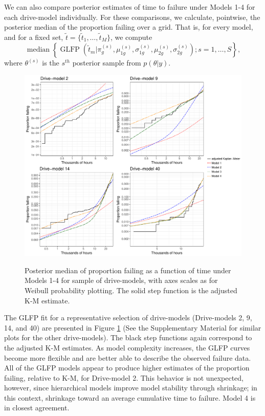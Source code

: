 \documentclass[aap]{imsart}
\newcommand{\op}{\operatorname}
\begin{document}
We can also compare posterior estimates of time to failure under Models 1-4 for each drive-model individually.  For these comparisons, we calculate, pointwise, the posterior median of the proportion failing over a grid. That is, for every model, and for a fixed set, $\tilde{t}=\{\tilde{t}_1,\ldots,\tilde{t}_M\}$, we compute 
\begin{equation}
\label{pointwise-medians}
\op{median}\left\{\op{GLFP}\left(\tilde{t}_m|\pi_{g}^{(s)},\mu_{1g}^{(s)},\sigma_{1g}^{(s)},\mu_{2g}^{(s)},\sigma_{2g}^{(s)}\right);s=1,\ldots,S \right\},
\end{equation}
where $\theta^{(s)}$ is the $s^{th}$ posterior sample from $p(\theta|y)$.

\begin{figure}[H]
{\centering
\includegraphics[width=\textwidth]{single-drive-4-Models-ex}}
\caption{Posterior median of proportion failing as a function of time under Models 1-4 for sample of drive-models, with axes scales as for Weibull probability plotting.  The solid step function is the adjusted K-M estimate.}
\label{fig:mod_comp_leg}
\end{figure}

The GLFP fit for a representative selection of drive-models (Drive-models 2, 9, 14, and 40) are presented in Figure \ref{fig:mod_comp_leg} (See the Supplementary Material for similar plots for the other drive-models).  The black step functions again correspond to the adjusted K-M estimates.  As model complexity increases, the GLFP curves become more flexible and are better able to describe the observed failure data.  All of the GLFP models appear to produce higher estimates of the proportion failing, relative to K-M, for Drive-model 2. This behavior is not unexpected, however, since hierarchical models improve model stability through shrinkage; in this context, shrinkage toward an average cumulative time to failure. Model 4 is in closest agreement. 
\end{document}
